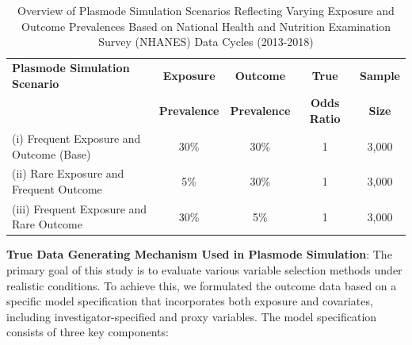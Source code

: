 \documentclass[sn-vancouver,Numbered,lineno,pdflatex]{sn-jnl}
\begin{document}
\begin{table}[ht]
\centering
\caption{Overview of Plasmode Simulation Scenarios Reflecting Varying Exposure and Outcome Prevalences Based on National Health and Nutrition Examination Survey (NHANES) Data Cycles (2013-2018)}
\label{table:scenarios}
\begin{tabular}{lcccc}
  \toprule
  \textbf{Plasmode Simulation Scenario} & \textbf{Exposure} & \textbf{Outcome} & \textbf{True} & \textbf{Sample}\\
  \textbf{} & \textbf{Prevalence} & \textbf{Prevalence} & \textbf{Odds Ratio} & \textbf{Size}\\
  \midrule
  (i) Frequent Exposure and Outcome (Base) & 30\% & 30\% & 1 & 3,000 \\
  (ii) Rare Exposure and Frequent Outcome & 5\% & 30\% & 1 & 3,000 \\
  (iii) Frequent Exposure and Rare Outcome & 30\% & 5\% & 1 & 3,000 \\
  \bottomrule
\end{tabular}
\end{table}

\textbf{True Data Generating Mechanism Used in Plasmode Simulation}: The
primary goal of this study is to evaluate various variable selection
methods under realistic conditions. To achieve this, we formulated the
outcome data based on a specific model specification that incorporates
both exposure and covariates, including investigator-specified and proxy
variables. The model specification consists of three key components:
\end{document}
